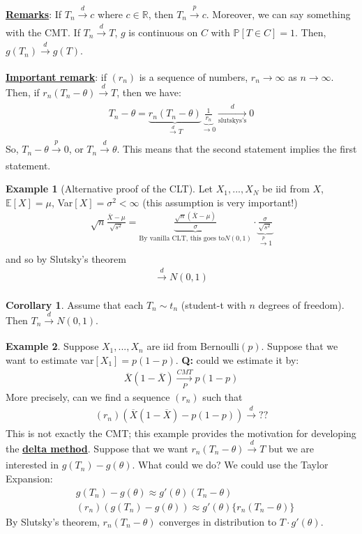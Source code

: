 \documentclass[11pt]{scrartcl}
\newcommand{\R}[0]{\mathbb{R}}
\theoremstyle{definition}
\newtheorem{corollary}{Corollary}
\newtheorem{ex}{Example}
\theoremstyle{remark}
\newcommand{\dfn}[1]{\textbf{\underline{#1}}}
\newcommand{\pr}[1]{\mathbb{P}[#1]}
\newcommand{\EX}[1]{\mathbb{E}\left[#1 \right]}
\begin{document}
{\dfn{Remarks}: If $T_n \xrightarrow[]{d} c$ where $c \in \R$, then $T_n \xrightarrow[]{p} c$. Moreover, we can say something with the CMT. If $T_n \xrightarrow[]{d} T$, $g$ is continuous on $C$ with $\pr{T \in C} = 1$. Then, $g(T_n) \xrightarrow[]{d} g(T)$. 

\dfn{Important remark}: if $(r_n)$ is a sequence of numbers, $r_n \rightarrow \infty$ as $n \rightarrow \infty$. Then, if $r_n (T_n - \theta) \xrightarrow[]{d} T$, then we have: 
\begin{align*} 
	T_n - \theta = \underbrace{r_n(T_n - \theta)}_{\xrightarrow[]{d} T} \underbrace{ \frac{1}{r_n}	}_{\rightarrow 0} \xrightarrow[\text{slutskys's}]{d} 0 
\end{align*}
So, $T_n - \theta \xrightarrow[]{p} 0$, or $T_n \xrightarrow[]{d} \theta$. This means that the second statement implies the first statement. 

\begin{ex}[Alternative proof of the CLT] 
		Let $X_1,..., X_N$ be iid from $X$, $\EX{X} = \mu$, Var$[X] = \sigma^2 < \infty$ (this assumption is very important!) 
		\begin{align}
			\sqrt{n} \frac{\overline{X} - \mu}{\sqrt{s^2}} = \underbrace{\frac{\sqrt{n} (\overline{X} - \mu)}{\sigma}}_{\text{By vanilla CLT, this goes to} N(0,1)} \cdot \underbrace{\frac{\sigma}{\sqrt{s^2}}}_{\xrightarrow[]{p} 1}
		\end{align}
		and so by Slutsky's theorem 
		\begin{align*} 
			\xrightarrow[]{d} N(0,1) 	
		\end{align*}
\end{ex}

\begin{corollary} Assume that each $T_n \sim t_n$ (student-t with $n$ degrees of freedom). Then $T_n \xrightarrow[]{d} N(0,1)$. 
	
\end{corollary}

\begin{ex}
	Suppose $X_1, ..., X_n$ are iid from Bernoulli$(p)$. Suppose that we want to estimate var$[X_1] = p(1-p)$. \textbf{Q:} could we estimate it by: 
	\begin{align*}
		\overline{X}(1- \overline{X} ) \xrightarrow[P]{CMT} p(1-p)	
	\end{align*}
	More precisely, can we find a sequence $(r_n)$ such that
	\begin{align*}
		(r_n) (\overline{X}(1-\overline{X}) - p(1-p) ) \xrightarrow[]{d} ?? 	
	\end{align*}
	This is not exactly the CMT; this example provides the motivation for developing the \dfn{delta method}. Suppose that we want $r_n(T_n - \theta) \xrightarrow[]{d} T$ but we are interested in $g(T_n) - g(\theta)$. What could we do? We could use the Taylor Expansion: 
	\begin{align*}
		& g(T_n) - g(\theta) \approx g'(\theta) (T_n - \theta) 	\\
		& (r_n) (g (T_n) - g(\theta) ) \approx g'(\theta) \{ r_n (T_n - \theta) \} 
	\end{align*}
	By Slutsky's theorem, $r_n(T_n - \theta)$ converges in distribution to $T \cdot g'(\theta)$. 
\end{ex}

}
\end{document}
